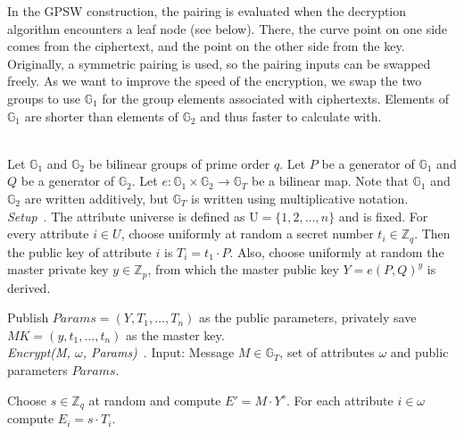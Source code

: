In the GPSW construction, the pairing is evaluated when the decryption algorithm encounters a leaf node (see below).
There, the curve point on one side comes from the ciphertext, and the point on the other side from the key.
Originally, a symmetric pairing is used, so the pairing inputs can be swapped freely.
As we want to improve the speed of the encryption, we swap the two groups to use $\mathbb{G}_1$ for the group elements associated with ciphertexts.
Elements of $\mathbb{G}_1$ are shorter than elements of $\mathbb{G}_2$ and thus faster to calculate with.


~\\

Let $\mathbb{G}_1$ and $\mathbb{G}_2$ be bilinear groups of prime order $q$. Let $P$ be a generator of $\mathbb{G}_1$ and $Q$ be a generator of $\mathbb{G}_2$. Let $e: \mathbb{G}_1 \times \mathbb{G}_2 \rightarrow \mathbb{G}_T$ be a bilinear map.
Note that $\mathbb{G}_1$ and $\mathbb{G}_2$ are written additively, but $\mathbb{G}_T$ is written using multiplicative notation.\\

\emph{Setup}~\cite{goyal_attribute-based_2006}.
The attribute universe is defined as $\text{U} = \{1, 2, \dots, n\}$ and is fixed.
For every attribute $i \in U$, choose uniformly at random a secret number $t_i \in \mathbb{Z}_q$.
Then the public key of attribute $i$ is $T_i = t_1 \cdot P$.
Also, choose uniformly at random the master private key $y \in \mathbb{Z}_p$, from which the master public key $Y = e(P, Q)^y$ is derived.

Publish $Params=(Y, T_1, \dots, T_n)$ as the public parameters, privately save $MK = (y, t_1, \dots, t_n)$ as the master key.
\\

\emph{Encrypt(M, $\omega$, Params)}~\cite{goyal_attribute-based_2006}.
Input: Message $M \in \mathbb{G}_T$, set of \glspl{attribute} $\omega$ and public parameters $Params$. 

Choose $s \in \mathbb{Z}_q$ at random and compute $E' = M \cdot Y^s$.
For each attribute $i \in \omega$ compute $E_i = s \cdot T_i$.

